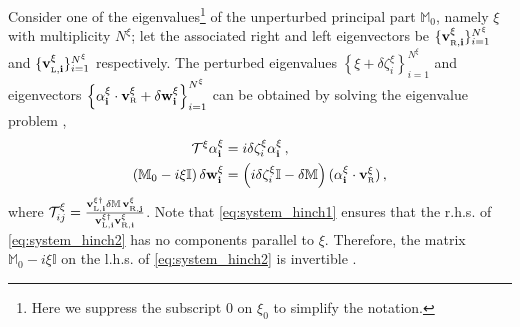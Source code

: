 \documentclass[reprint,aps,amsmath,amssymb,twoside,prd,showkeys,superscriptaddress,nofootinbib]{revtex4-2}
\begin{document}
Consider one of the eigenvalues\footnote{Here we suppress the subscript $0$ on $\xi_0$ to simplify the notation.} of the unperturbed principal part $\mathbb{M}_0$, namely $\xi$ with multiplicity $N^\xi$; let the associated right and left eigenvectors be $\{{\bf v^{\xi}_{\text{\tiny R},i}}\}_{i=1}^{N^{\xi}}$ and $\{{\bf v^{\xi}_{\text{\tiny L},i}}\}_{i=1}^{N^{\xi}}$ respectively. The perturbed eigenvalues $\left\{\xi+\delta\zeta^{\xi}_i\right\}_{i=1}^{N^{\xi}}$ and eigenvectors $\left\{{\bf \alpha^{\xi}_i}\cdot{\bf v_{\text{\tiny R}}^{\xi}} + \delta{\bf w^{\xi}_i} \right\}_{i=1}^{N^{\xi}}$ can be obtained by solving the eigenvalue problem \cite{hinch},
\begin{align}
{\mathcal T}^{\xi}{\bf\alpha^{\xi}_i} &= i\delta\zeta^{\xi}_i{\bf\alpha^{\xi}_i} \,, \label{eq:system_hinch1}\\ 
\left(\mathbb{M}_0-i\xi{\mathbb I} \right)\delta{\bf w^{\xi}_i} &=\left(i\delta\zeta^{\xi}_i{\mathbb I}-\delta\mathbb{M} \right)({\bf \alpha^{\xi}_i}\cdot{\bf v_{\text{\tiny R}}^{\xi}})\,, \label{eq:system_hinch2}
\end{align}
where ${\mathcal T}^{\xi}_{ij}= \frac{{\bf v_{\text{\tiny L},i}^{\xi\dagger}}\delta\mathbb{M}\,{\bf v_{\text{\tiny R},j}^{\xi}}}{{\bf v_{\text{\tiny L},i}^{\xi\dagger}}{\bf v_{\text{\tiny R},i}^{\xi}}}$. Note that \eqref{eq:system_hinch1} ensures that the r.h.s. of \eqref{eq:system_hinch2} has no components parallel to $\xi$. Therefore,  the matrix  ${\mathbb M}_0-i\xi{\mathbb I}$ on the l.h.s. of \eqref{eq:system_hinch2} is invertible \cite{hinch}.
\end{document}
